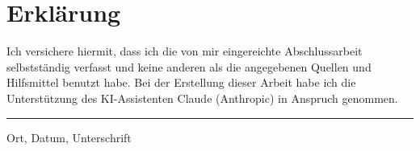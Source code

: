 \thispagestyle{empty}
\section*{Erklärung}

Ich versichere hiermit, dass ich die von mir eingereichte Abschlussarbeit selbstständig verfasst und keine anderen als die angegebenen Quellen und Hilfsmittel benutzt habe. Bei der Erstellung dieser Arbeit habe ich die Unterstützung des KI-Assistenten Claude (Anthropic) in Anspruch genommen.

\vspace*{50pt}


\hrule
\vspace*{5pt}
Ort, Datum, Unterschrift

\vspace*{140pt}

